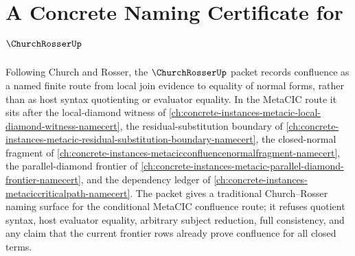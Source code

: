 \chapter{A Concrete Naming Certificate for $\ChurchRosserUp$}
\label{ch:concrete-instances-church-rosser-namecert}

Following Church and Rosser, the $\ChurchRosserUp$ packet records confluence as a named finite route from local join evidence to equality of normal forms, rather than as host syntax quotienting or evaluator equality. In the MetaCIC route it sits after the local-diamond witness of \autoref{ch:concrete-instances-metacic-local-diamond-witness-namecert}, the residual-substitution boundary of \autoref{ch:concrete-instances-metacic-residual-substitution-boundary-namecert}, the closed-normal fragment of \autoref{ch:concrete-instances-metacicconfluencenormalfragment-namecert}, the parallel-diamond frontier of \autoref{ch:concrete-instances-metacic-parallel-diamond-frontier-namecert}, and the dependency ledger of \autoref{ch:concrete-instances-metaciccriticalpath-namecert}. The packet gives a traditional Church--Rosser naming surface for the conditional MetaCIC confluence route; it refuses quotient syntax, host evaluator equality, arbitrary subject reduction, full consistency, and any claim that the current frontier rows already prove confluence for all closed terms.

